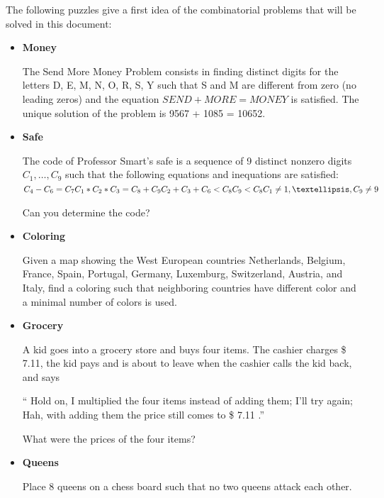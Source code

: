 \documentclass[a4paper,halfparskip]{scrartcl}
\begin{document}
The following puzzles give a first idea of the combinatorial problems
that will be solved in this document:

\begin{itemize}
\item
\textbf{Money}

The Send More Money Problem consists in finding distinct 
digits for the letters 
D, E, M, N, O, R, S, Y such that S and M are different 
from zero (no leading zeros) and 
the equation
    $ SEND + MORE = MONEY $
is satisfied. The unique solution of the problem is 
9567 + 1085 = 10652.

\item
\textbf{Safe}

The code of Professor Smart's safe is a sequence of 9 
distinct nonzero digits 
$ C_1,\ldots,C_9 $ such that the following equations 
and inequations are satisfied:\\
     $ C_4 - C_6 = C_7 \\ 
     C_1 * C_2 * C_3 = C_8 + C_9 \\ 
     C_2 + C_3 + C_6 < C_8 \\ 
     C_9 < C_8 \\ 
     C_1 \neq 1,\ldots, C_9 \neq 9 $

Can you determine the code?

\item
\textbf{Coloring}

Given a map showing the West European countries Netherlands, 
Belgium, France, Spain, 
Portugal, Germany, Luxemburg, Switzerland, Austria, and Italy, 
find a coloring such 
that neighboring countries have different color and a minimal 
number of colors is used.

\item

\textbf{Grocery}

A kid goes into a grocery store and buys four items. The cashier 
charges \$ 7.11, the kid 
pays and is about to leave when the cashier calls the kid back, 
and says

`` Hold on, I multiplied the four items instead of adding them; 
I'll try again; 
Hah, with adding them the price still comes to \$ 7.11 .''

What were the prices of the four items?

\item
\textbf{Queens}

Place 8 queens on a chess board such that no two queens attack 
each other.
\end{itemize}
\end{document}
